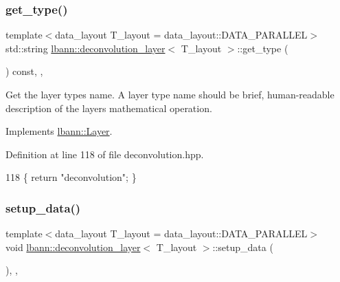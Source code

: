 \mbox{\label{classlbann_1_1deconvolution__layer_a8258c15978a081e3d3166a6a05579985}} 
\subsubsection{\texorpdfstring{get\+\_\+type()}{get\_type()}}
{\footnotesize\ttfamily template$<$data\+\_\+layout T\+\_\+layout = data\+\_\+layout\+::\+D\+A\+T\+A\+\_\+\+P\+A\+R\+A\+L\+L\+EL$>$ \\
std\+::string \hyperlink{classlbann_1_1deconvolution__layer}{lbann\+::deconvolution\+\_\+layer}$<$ T\+\_\+layout $>$\+::get\+\_\+type (\begin{DoxyParamCaption}{ }\end{DoxyParamCaption}) const\hspace{0.3cm}{\ttfamily [inline]}, {\ttfamily [override]}, {\ttfamily [virtual]}}

Get the layer type\textquotesingle{}s name. A layer type name should be brief, human-\/readable description of the layer\textquotesingle{}s mathematical operation. 

Implements \hyperlink{classlbann_1_1Layer_a0fa0ea9160b490c151c0a17fde4f7239}{lbann\+::\+Layer}.



Definition at line 118 of file deconvolution.\+hpp.


\begin{DoxyCode}
118 \{ \textcolor{keywordflow}{return} \textcolor{stringliteral}{"deconvolution"}; \}
\end{DoxyCode}
\mbox{\label{classlbann_1_1deconvolution__layer_a6d891396ea1c91030cd647cc111c8c5f}} 
\subsubsection{\texorpdfstring{setup\+\_\+data()}{setup\_data()}}
{\footnotesize\ttfamily template$<$data\+\_\+layout T\+\_\+layout = data\+\_\+layout\+::\+D\+A\+T\+A\+\_\+\+P\+A\+R\+A\+L\+L\+EL$>$ \\
void \hyperlink{classlbann_1_1deconvolution__layer}{lbann\+::deconvolution\+\_\+layer}$<$ T\+\_\+layout $>$\+::setup\+\_\+data (\begin{DoxyParamCaption}{ }\end{DoxyParamCaption})\hspace{0.3cm}{\ttfamily [inline]}, {\ttfamily [override]}, {\ttfamily [virtual]}}

